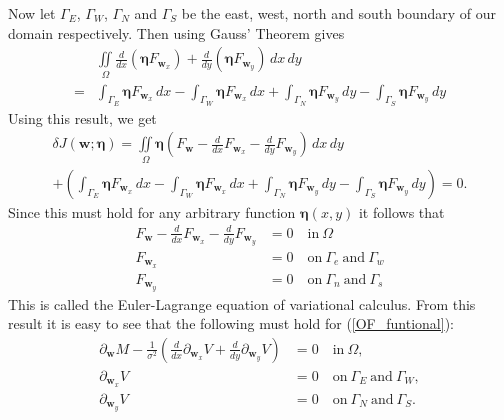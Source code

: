 Now let $\Gamma_{E}$, $\Gamma_{W}$, $\Gamma_{N}$ and $\Gamma_{S}$ be the east, west, north and south boundary of our domain respectively. Then using Gauss' Theorem gives
\begin{align*}
& \iint \limits_{\Omega}  \frac{d}{d x} (\bm{\eta} F_{\textbf{w}_x}) + \frac{d }{d y} (\bm{\eta} F_{\textbf{w}_y}) \, dx \, dy \\ 
=  &\int_{\Gamma_{E}} \bm{\eta} F_{\textbf{w}_x} \, dx - \int_{\Gamma_{W}} \bm{\eta} F_{\textbf{w}_x} \, dx + \int_{\Gamma_{N}} \bm{\eta} F_{\textbf{w}_y} \, dy - \int_{\Gamma_{S}} \bm{\eta} F_{\textbf{w}_y} \, dy
\end{align*}
Using this result, we get
\begin{multline*}
\delta J(\textbf{w};\bm{\eta}) = \iint \limits_{\Omega} \bm{\eta} \left( F_\textbf{w} -  \frac{d}{d x} F_{\textbf{w}_x} - \frac{d }{d y} F_{\textbf{w}_y} \right) \, dx \, dy  \\ 
+  \left( \int_{\Gamma_{E}} \bm{\eta} F_{\textbf{w}_x} \, dx - \int_{\Gamma_{W}} \bm{\eta} F_{\textbf{w}_x} \, dx + \int_{\Gamma_{N}} \bm{\eta} F_{\textbf{w}_y} \, dy - \int_{\Gamma_{S}} \bm{\eta} F_{\textbf{w}_y} \, dy \right) = 0.
\end{multline*}
Since this must hold for any arbitrary function $\bm{\eta}(x,y)$ it follows that
\begin{align*}
F_{\textbf{w}} - \frac{d}{dx} F_{\textbf{w}_x} - \frac{d }{d y} F_{\textbf{w}_y} &= 0 \quad \text{in} \ \Omega \\
F_{\textbf{w}_x} &= 0 \quad \text{on} \ \Gamma_e \ \text{and} \ \Gamma_w \\
F_{\textbf{w}_y}& = 0 \quad \text{on} \ \Gamma_n \ \text{and} \ \Gamma_s
\end{align*}
This is called the Euler-Lagrange equation of variational calculus. From this result it is easy to see that the following must hold for (\ref{OF_funtional}):
\begin{equation}
\label{EL}
  \begin{aligned}
\partial_{\textbf{w}} M - \frac{1}{\sigma^2}\left( \frac{d}{d x} \partial_{\textbf{w}_x} V + \frac{d}{d y} \partial_{\textbf{w}_y} V \right) &= 0 \quad \text{in} \ \Omega,  \\
\partial_{\textbf{w}_x} V &= 0 \quad \text{on} \ \Gamma_E \ \text{and} \ \Gamma_W, \\
\partial_{\textbf{w}_y} V &= 0 \quad \text{on} \ \Gamma_N \ \text{and} \ \Gamma_S.
  \end{aligned}
\end{equation}

